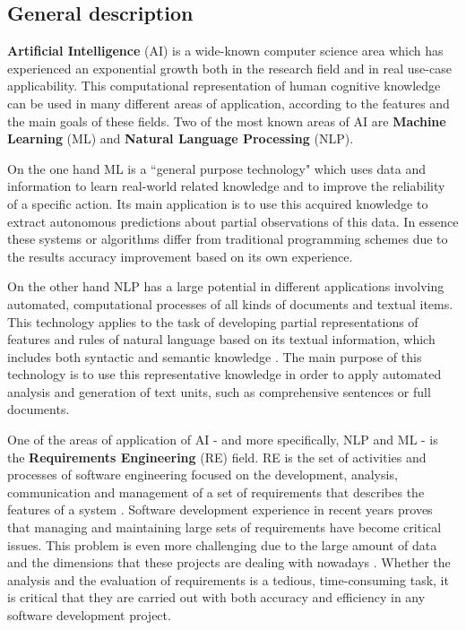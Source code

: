 \documentclass[11pt]{article}
\begin{document}
\subsection{General description}
\label{sec:general_introduction}

\textbf{Artificial Intelligence} (AI) is a wide-known computer science area which has experienced an exponential growth both in the research field and in real use-case applicability. This computational representation of human cognitive knowledge can be used in many different areas of application, according to the features and the main goals of these fields. Two of the most known areas of AI are \textbf{Machine Learning} (ML) and \textbf{Natural Language Processing} (NLP).

On the one hand ML is a ``general purpose technology"\cite{b8} which uses data and information to learn real-world related knowledge and to improve the reliability of a specific action. Its main application is to use this acquired knowledge to extract autonomous predictions about partial observations of this data. In essence these systems or algorithms differ from traditional programming schemes due to the results accuracy improvement based on its own experience.

On the other hand NLP has a large potential in different applications involving automated, computational processes of all kinds of documents and textual items. This technology applies to the task of developing partial representations of features and rules of natural language based on its textual information, which includes both syntactic and semantic knowledge \cite{b1}.  The main purpose of this technology is to use this representative knowledge in order to apply automated analysis and generation of text units, such as comprehensive sentences or full documents.

One of the areas of application of AI - and more specifically, NLP and ML - is the \textbf{Requirements Engineering} (RE) field. RE is the set of activities and processes of software engineering focused on the development, analysis, communication and management of a set of requirements that describes the features of a system \cite{b2}. Software development experience in recent years proves that managing and maintaining large sets of requirements have become critical issues. This problem is even more challenging due to the large amount of data and the dimensions that these projects are dealing with nowadays \cite{b3}. Whether the analysis and the evaluation of requirements is a tedious, time-consuming task,  it is critical that they are carried out with both accuracy and efficiency in any software development project.
\end{document}
